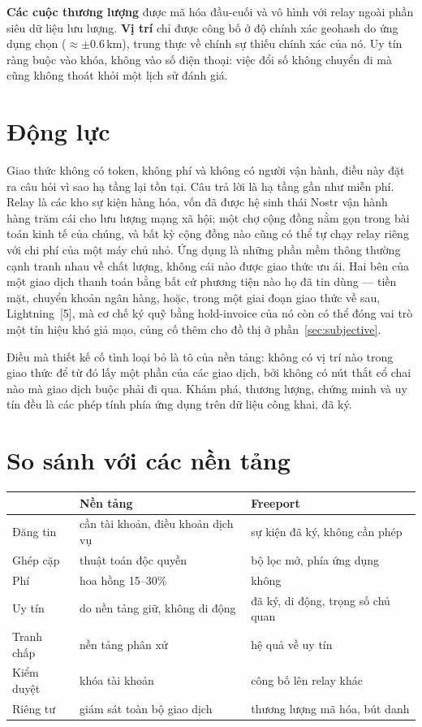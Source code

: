 \documentclass[11pt]{article}
\begin{document}
\textbf{Các cuộc thương lượng} được mã hóa đầu-cuối và vô hình với relay ngoài
phần siêu dữ liệu lưu lượng. \textbf{Vị trí} chỉ được công bố ở độ chính xác
geohash do ứng dụng chọn ($\approx \pm 0.6$\,km), trung thực về chính sự thiếu
chính xác của nó. Uy tín ràng buộc vào khóa, không vào số điện thoại: việc đổi
số không chuyển đi mà cũng không thoát khỏi một lịch sử đánh giá.

\section{Động lực}

Giao thức không có token, không phí và không có người vận hành, điều này đặt
ra câu hỏi vì sao hạ tầng lại tồn tại. Câu trả lời là hạ tầng gần như miễn
phí. Relay là các kho sự kiện hàng hóa, vốn đã được hệ sinh thái Nostr vận
hành hàng trăm cái cho lưu lượng mạng xã hội; một chợ cộng đồng nằm gọn trong
bài toán kinh tế của chúng, và bất kỳ cộng đồng nào cũng có thể tự chạy relay
riêng với chi phí của một máy chủ nhỏ. Ứng dụng là những phần mềm thông thường
cạnh tranh nhau về chất lượng, không cái nào được giao thức ưu ái. Hai bên của
một giao dịch thanh toán bằng bất cứ phương tiện nào họ đã tin dùng --- tiền
mặt, chuyển khoản ngân hàng, hoặc, trong một giai đoạn giao thức về sau,
Lightning~[5], mà cơ chế ký quỹ bằng hold-invoice của nó còn có thể đóng vai
trò một tín hiệu khó giả mạo, củng cố thêm cho đồ thị ở
phần~\ref{sec:subjective}.

Điều mà thiết kế cố tình loại bỏ là tô của nền tảng: không có vị trí nào trong
giao thức để từ đó lấy một phần của các giao dịch, bởi không có nút thắt cổ
chai nào mà giao dịch buộc phải đi qua. Khám phá, thương lượng, chứng minh và
uy tín đều là các phép tính phía ứng dụng trên dữ liệu công khai, đã ký.

\section{So sánh với các nền tảng}

\begin{center}
\begin{tabular}{lll}
\toprule
 & \textbf{Nền tảng} & \textbf{Freeport} \\
\midrule
Đăng tin    & cần tài khoản, điều khoản dịch vụ & sự kiện đã ký, không cần phép \\
Ghép cặp    & thuật toán độc quyền              & bộ lọc mở, phía ứng dụng \\
Phí         & hoa hồng 15--30\%                 & không \\
Uy tín      & do nền tảng giữ, không di động    & đã ký, di động, trọng số chủ quan \\
Tranh chấp  & nền tảng phân xử                  & hệ quả về uy tín \\
Kiểm duyệt  & khóa tài khoản                    & công bố lên relay khác \\
Riêng tư    & giám sát toàn bộ giao dịch        & thương lượng mã hóa, bút danh \\
\bottomrule
\end{tabular}
\end{center}
\end{document}
